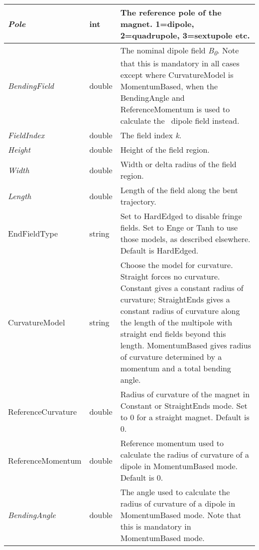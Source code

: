 \begin{center}
\tabletail{}
\tablelasttail{}
\begin{supertabular}{|m{3.689cm}|m{1.252cm}|m{12.054cm}|}
\hline
{\itshape Pole} &
int &
The reference pole of the magnet. 1=dipole, 2=quadrupole, 3=sextupole etc.\\\hline
{\itshape BendingField} &
double &
The nominal dipole field \textit{B}\textit{\textsubscript{0}}. Note that this is mandatory in all cases except where
CurvatureModel is MomentumBased, when the BendingAngle and ReferenceMomentum is used to calculate the \ dipole field
instead.\\\hline
{\itshape FieldIndex} &
double &
The field index \textit{k}.\\\hline
{\itshape Height} &
double &
Height of the field region.\\\hline
{\itshape Width} &
double &
Width or delta radius of the field region.\\\hline
{\itshape Length} &
double &
Length of the field along the bent trajectory.\\\hline
EndFieldType &
string &
Set to HardEdged to disable fringe fields. Set to Enge or Tanh to use those models, as described elsewhere. Default is
HardEdged.\\\hline
CurvatureModel &
string &
Choose the model for curvature. Straight forces no curvature. Constant gives a constant radius of curvature;
StraightEnds gives a constant radius of curvature along the length of the multipole with straight end fields beyond
this length. MomentumBased gives radius of curvature determined by a momentum and a total bending angle.\\\hline
ReferenceCurvature &
double &
Radius of curvature of the magnet in Constant or StraightEnds mode. Set to 0 for a straight magnet. Default is
0.\\\hline
ReferenceMomentum &
double &
Reference momentum used to calculate the radius of curvature of a dipole in MomentumBased mode. Default is 0.\\\hline
{\itshape BendingAngle} &
double &
The angle used to calculate the radius of curvature of a dipole in MomentumBased mode. Note that this is mandatory in
MomentumBased mode.\\\hline
\end{supertabular}
\end{center}

